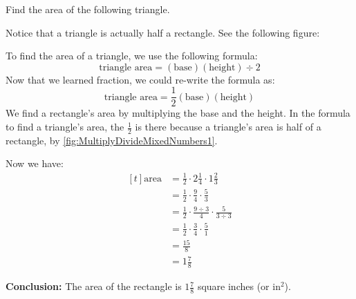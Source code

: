 \begin{myexample}
Find the area of the following triangle.
\begin{center}
\end{center}
\end{myexample}
\begin{solution}

Notice that a triangle is actually half a rectangle. See the following figure:
\begin{center}
\label{fig:MultiplyDivideMixedNumbers1}
\end{center}

To find the area of a triangle, we use the following formula:
\[ \text{triangle area}=(\text{base})(\text{height})\div2 \]
Now that we learned fraction, we could re-write the formula as:
\[ \text{triangle area}=\frac{1}{2}(\text{base})(\text{height}) \]
We find a rectangle's area by multiplying the base and the height. In the formula to find a triangle's area, the $\frac{1}{2}$ is there because a triangle's area is half of a rectangle, by \cref{fig:MultiplyDivideMixedNumbers1}.

Now we have:
\[ 
\begin{aligned}[t]
	\text{area}&= \frac{1}{2} \cdot 2\frac{1}{4} \cdot 1\frac{2}{3} \\
	&= \frac{1}{2} \cdot \frac{9}{4} \cdot \frac{5}{3} \\
	&= \frac{1}{2} \cdot \frac{9\div3}{4} \cdot \frac{5}{3\div3} \\
	&= \frac{1}{2} \cdot \frac{3}{4} \cdot \frac{5}{1} \\
	&= \frac{15}{8} \\
	&= 1\frac{7}{8}
\end{aligned}
\]

\textbf{Conclusion:} The area of the rectangle is $1\frac{7}{8}$ square inches (or $\text{in}^{2}$).
\end{solution}

